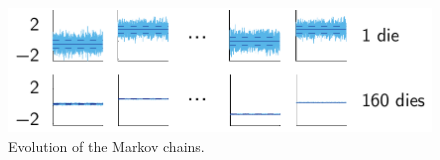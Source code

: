 \begin{figure}
  \centering
  \includegraphics[width=0.9\linewidth]{include/figures/chains.pdf}
  \caption{Evolution of the Markov chains.}
  \vspace{-1.5em}
\end{figure}

